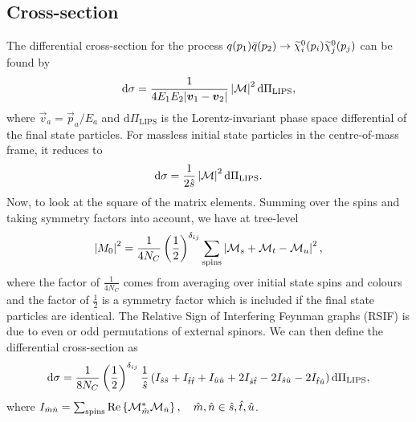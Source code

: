 \documentclass[english,notitlepage]{article}
\begin{document}
\subsection{Cross-section}
    The differential cross-section for the process \(q(p_1)\bar{q}(p_2) \to \nino[i](p_i) \nino[j](p_j)\) can be found by
    \begin{equation}
        \mathrm{d}\sigma = \frac{1}{4E_1E_2|\vec{v}_1 - \vec{v}_2|} \abs{\M}^2 \mathrm{d}\Pi_\text{LIPS},
    \end{equation}
    where \(\vec{v}_a = \vec{p}_a / E_a\) and \(\mathrm{d}\Pi_\text{LIPS}\) is the Lorentz-invariant phase space differential of the final state particles.
    For massless initial state particles in the centre-of-mass frame, it
    reduces to
    \begin{equation}
        \mathrm{d}\sigma = \frac{1}{2\hat{s}} \abs{\M}^2 \mathrm{d}\Pi_\text{LIPS}.
    \end{equation}
    Now, to look at the square of the matrix elements.
    Summing over the spins and taking symmetry factors into account, we have at tree-level
    \begin{align}
        \abs{M_0}^2 = \frac{1}{4 N_C} \pclosed{\frac{1}{2}}^{\delta_{ij}} \sum_\text{spins} \abs{\M_s + \M_t - \M_u}^2,
    \end{align}
    where the factor of \(\frac{1}{4N_C}\) comes from averaging over initial state spins and colours and the factor of \(\frac{1}{2}\) is a symmetry factor which is included if the final state particles are identical.
    The Relative Sign of Interfering Feynman graphs (RSIF) is due to even or odd permutations of external spinors.
    We can then define the differential cross-section as
    \begin{equation}
        \label{eq:dsigma}
        \mathrm{d}\sigma = \frac{1}{8N_C} \pclosed{\frac{1}{2}}^{\delta_{ij}} \frac{1}{\hat{s}} \pclosed{I_{\hat{s}\hat{s}} + I_{\hat{t}\hat{t}} + I_{\hat{u}\hat{u}} + 2I_{\hat{s}\hat{t}} - 2I_{\hat{s}\hat{u}} - 2I_{\hat{t}\hat{u}}} \mathrm{d}\Pi_\text{LIPS},
    \end{equation}
    where \(I_{\hat{m}\hat{n}} = \sum_{\text{spins}} \Re{\M_{\hat{m}}^\ast \M_{\hat{n}}}, \quad \hat{m}, \hat{n} \in \hat{s}, \hat{t}, \hat{u}\).
\end{document}
